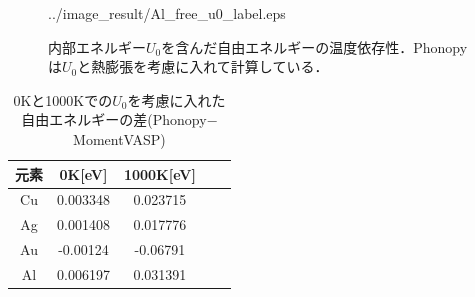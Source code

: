 \begin{figure}[htbp]
\begin{minipage}[b]{0.5\linewidth}
  {../image_result/Al_free_u0_label.eps}
  \label{free8}
 \end{minipage}
 \caption{内部エネルギー$U_0$を含んだ自由エネルギーの温度依存性．Phonopyは$U_0$と熱膨張を考慮に入れて計算している．}\label{fig:freeresult2}
\end{figure}

\begin{table}[htbp]
\caption{0Kと1000Kでの$U_0$を考慮に入れた自由エネルギーの差(Phonopy$-$MomentVASP)}
  \label{tb:free-diff3}
  \centering
  \begin{tabular}{ccccc}\hline
    元素 & 0K[eV] & 1000K[eV] \\ \hline \hline
    Cu & 0.003348 & 0.023715 \\
    Ag & 0.001408 & 0.017776 \\
    Au & -0.00124 & -0.06791 \\
    Al & 0.006197 & 0.031391 \\ \hline
  \end{tabular}
\end{table}
